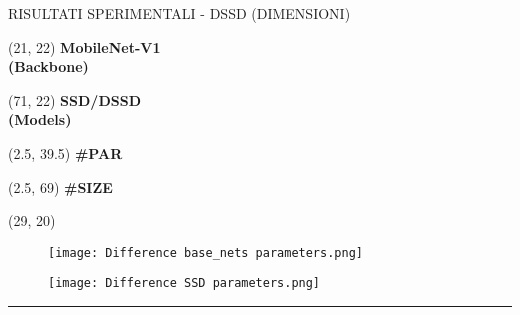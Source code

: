 
\begin{frame}{RISULTATI SPERIMENTALI - DSSD (DIMENSIONI)}
    \centering
    \begin{textblock}{40}(21, 22)
        \bfseries{MobileNet-V1\\(Backbone)}
    \end{textblock}
    \begin{textblock}{40}(71, 22)
        \bfseries{SSD/DSSD\\(Models)}
    \end{textblock}
    \begin{textblock}{5}(2.5, 39.5)
        \bfseries{\#PAR}
    \end{textblock}
    \begin{textblock}{5}(2.5, 69)
        \bfseries{\#SIZE}
    \end{textblock}
    \begin{textblock}{70}(29, 20)
    \end{textblock}
    \vspace{0.8cm}
    \begin{minipage}{\linewidth}
        \centering
        \begin{minipage}{0.45\linewidth}
            \begin{figure}
                \centering
                \texttt{[image: Difference base\_nets parameters.png]}
                \centering
            \end{figure}
        \end{minipage}
        \begin{minipage}{0.45\linewidth}
            \begin{figure}
                \centering
                \texttt{[image: Difference SSD parameters.png]}
                \centering
            \end{figure}
        \end{minipage}
        \vspace{0.3cm}
    \end{minipage}
    {\rule{\textwidth}{2pt}}
    \begin{minipage}{\linewidth}
        \vspace{0.3cm}
        \centering
        \begin{minipage}{0.45\linewidth}
            \begin{figure}
                \centering

\end{figure}
\end{minipage}
\end{minipage}
\end{frame}
